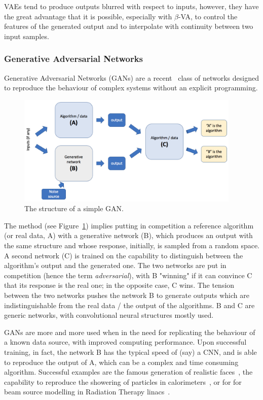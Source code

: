 VAEs tend to produce outputs blurred with respect to inputs, however, they have the great advantage that it is possible, especially with $\beta$-VA, to control the features of the generated output and to interpolate with continuity between two input samples.

\subsubsection{Generative Adversarial Networks}
\label{subsec:gan}
Generative Adversarial Networks (GANs) are a recent~\cite{Goodfellow2020} class of networks designed to reproduce the behaviour of complex systems without an explicit programming.

\begin{figure}[h]
     \centering
     \includegraphics[width=0.95\textwidth]{images/gan.png}
     \caption{The structure of a simple GAN.}
     \label{fig:gan}
 \end{figure}

The method (see Figure~\ref{fig:gan}) implies putting in competition a reference algorithm (or real data, A) with a generative network (B), which produces an output with the same structure and whose response, initially, is sampled from a random space. A second network (C) is trained on the capability to distinguish between the algorithm's output and the generated one. The two networks are put in competition (hence the term \emph{adversarial}), with B "winning" if it can convince C that its response is the real one; in the opposite case, C wins.
The tension between the two networks pushes the network B to generate outputs which are indistinguishable from the real data / the output of the  algorithms. B and C are generic networks, with convolutional neural structures mostly used.

GANs are more and more used when in the need for replicating the behaviour of a known data source, with improved computing performance. Upon successful training, in fact, the network B has the typical speed of (say) a CNN, and is able to reproduce the output of A, which can be a complex and time consuming algorithm. Successful examples are the famous generation of realistic faces~\cite{faces}, the capability to reproduce the showering of particles in calorimeters~\cite{Paganini2018}, or for 
for beam source modelling in Radiation Therapy linacs~\cite{Sarrut2019}.

